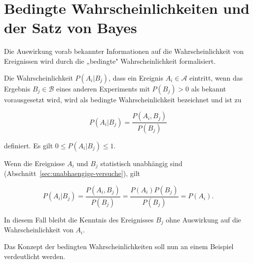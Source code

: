 \section{Bedingte Wahrscheinlichkeiten und der Satz von Bayes}
\label{sec:bedingte-wahrscheinlichkeit}

Die Auswirkung vorab bekannter Informationen auf die Wahrscheinlichkeit von Ereignissen wird durch die „bedingte" Wahrscheinlichkeit formalisiert.

\begin{definition}
Die Wahrscheinlichkeit $P(A_i|B_j)$, dass ein Ereignis $A_i \in \mathcal{A}$ eintritt, wenn das Ergebnis $B_j \in \mathcal{B}$ eines anderen Experiments mit $P(B_j) > 0$ als bekannt vorausgesetzt wird, wird als bedingte Wahrscheinlichkeit bezeichnet und ist zu

$$
P(A_i|B_j) = \frac{P(A_i, B_j)}{P(B_j)}
$$

definiert. Es gilt $0 \leq P(A_i|B_j) \leq 1$.
\end{definition}

Wenn die Ereignisse $A_i$ und $B_j$ statistisch unabhängig sind (Abschnitt~\ref{sec:unabhaengige-versuche}), gilt

$$
P(A_i|B_j) = \frac{P(A_i, B_j)}{P(B_j)} = \frac{P(A_i)P(B_j)}{P(B_j)} = P(A_i).
$$

In diesem Fall bleibt die Kenntnis des Ereignisses $B_j$ ohne Auswirkung auf die Wahrscheinlichkeit von $A_i$.

Das Konzept der bedingten Wahrscheinlichkeiten soll nun an einem Beispiel verdeutlicht werden.

